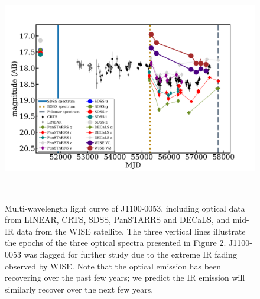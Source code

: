 \documentclass{nature}
\begin{document}
\begin{figure}
  \centering
  \includegraphics[width=16.00cm, height=10.00cm, trim=0.0cm 0.0cm 0.0cm 0.0cm, clip]
  {../plots/lc/J110057_lc_20171204v1.png}
  \caption[]{
    Multi-wavelength light curve of J1100-0053,
    including optical data from LINEAR, CRTS, SDSS, PanSTARRS and
    DECaLS, and mid-IR data from the WISE satellite.  The three vertical
    lines illustrate the epochs of the three optical spectra presented
    in Figure 2.  J1100-0053 was flagged for further study due to the
    extreme IR fading observed by WISE.  Note that the optical emission
    has been recovering over the past few years; we predict the IR
    emission will similarly recover over the next few years.}
  \label{fig:J110057_LC_CRTS}
\end{figure}
\end{document}
